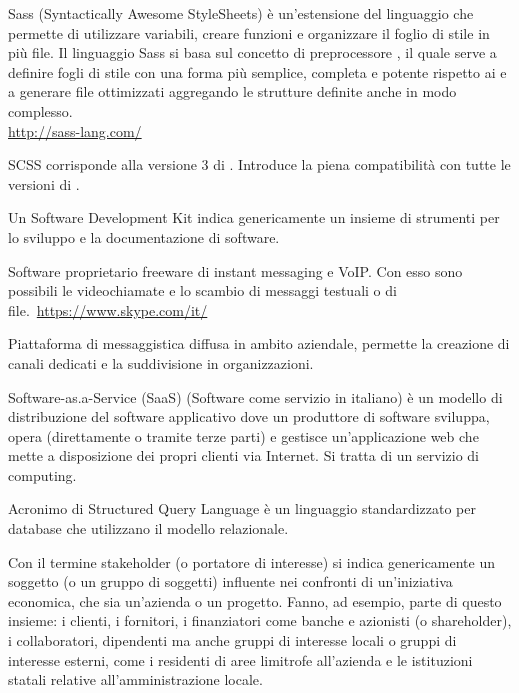 Sass (Syntactically Awesome StyleSheets) è un'estensione del linguaggio  che permette di utilizzare variabili, creare funzioni e organizzare il foglio di stile in più file. Il linguaggio Sass si basa sul concetto di preprocessore , il quale serve a definire fogli di stile con una forma più semplice, completa e potente rispetto ai  e a generare file  ottimizzati aggregando le strutture definite anche in modo complesso.\\
\url{http://sass-lang.com/}

SCSS corrisponde alla versione 3 di . Introduce la piena compatibilità con tutte le versioni di .

Un Software Development Kit indica genericamente un insieme di strumenti per lo sviluppo e la documentazione di software.

Software proprietario freeware di instant messaging e VoIP. Con esso sono possibili le videochiamate e lo scambio di messaggi testuali o di file.\
\url{https://www.skype.com/it/}

Piattaforma di messaggistica diffusa in ambito aziendale, permette la creazione di canali dedicati e la suddivisione in organizzazioni. 

Software-as.a-Service (SaaS) (Software come servizio in italiano) è un modello di distribuzione del software applicativo dove un produttore di software sviluppa, opera (direttamente o tramite terze parti) e gestisce un'applicazione web che mette a disposizione dei propri clienti via Internet. Si tratta di un servizio di  computing.

Acronimo di Structured Query Language è un linguaggio standardizzato per database che utilizzano il modello relazionale.

Con il termine stakeholder (o portatore di interesse) si indica genericamente un soggetto (o un gruppo di soggetti) influente nei confronti di un'iniziativa economica, che sia un'azienda o un progetto.
Fanno, ad esempio, parte di questo insieme: i clienti, i fornitori, i finanziatori come banche e azionisti (o shareholder), i collaboratori, dipendenti ma anche gruppi di interesse locali o gruppi di interesse esterni, come i residenti di aree limitrofe all'azienda e le istituzioni statali relative all'amministrazione locale.

